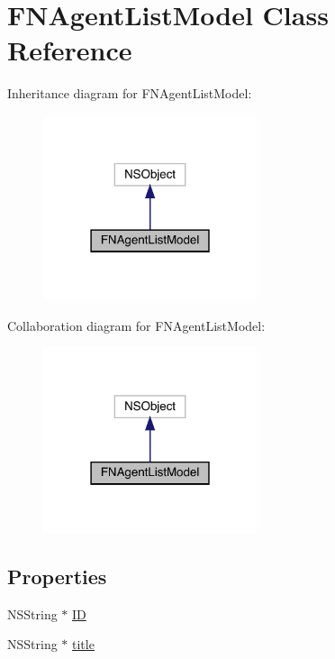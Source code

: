 \hypertarget{interface_f_n_agent_list_model}{}\section{F\+N\+Agent\+List\+Model Class Reference}
\label{interface_f_n_agent_list_model}


Inheritance diagram for F\+N\+Agent\+List\+Model\+:\nopagebreak
\begin{figure}[H]
\begin{center}
\leavevmode
\includegraphics[width=178pt]{interface_f_n_agent_list_model__inherit__graph}
\end{center}
\end{figure}


Collaboration diagram for F\+N\+Agent\+List\+Model\+:\nopagebreak
\begin{figure}[H]
\begin{center}
\leavevmode
\includegraphics[width=178pt]{interface_f_n_agent_list_model__coll__graph}
\end{center}
\end{figure}
\subsection*{Properties}
\begin{DoxyCompactItemize}
\item 
N\+S\+String $\ast$ \mbox{\hyperlink{interface_f_n_agent_list_model_afcd1921a5d1ee3d5d11a4fe87b0cc084}{ID}}
\item 
N\+S\+String $\ast$ \mbox{\hyperlink{interface_f_n_agent_list_model_a98a1f4261e4e38441a18075003ee4da8}{title}}
\end{DoxyCompactItemize}



